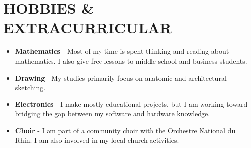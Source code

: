 \documentclass[letterpaper,11pt]{article}
\newcommand{\resumeItem}[1]{
	\item\small{
		{#1 \vspace{-1pt}}
	}
}
\newcommand{\resumeItemListStart}{\begin{itemize}[leftmargin=0.1in]}
\newcommand{\resumeItemListEnd}{\end{itemize}\vspace{-5pt}}
\begin{document}
	\section{\color{BrickRed}HOBBIES \& EXTRACURRICULAR}
    
	\resumeItemListStart
	\vspace{0.5pt}
	
	\resumeItem{\normalsize{\textbf{Mathematics} - Most of my time is spent thinking and reading about mathematics. I also give free lessons to middle school and business students.}}
	\vspace{0pt}
	
	\resumeItem{\normalsize{\textbf{Drawing} - My studies primarily focus on anatomic and architectural sketching.}}
    \vspace{0pt}

    \resumeItem{\normalsize{\textbf{Electronics} - I make mostly educational projects, but I am working toward bridging the gap between my software and hardware knowledge.}}
    \vspace{0pt}

    \resumeItem{\normalsize{\textbf{Choir} - I am part of a community choir with the Orchestre National du Rhin. I am also involved in my local church activities.}}
    \vspace{0pt}
	
	\resumeItemListEnd
	
\end{document}
